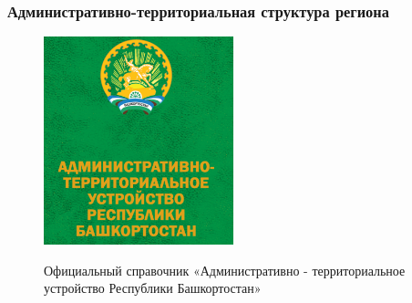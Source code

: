\begin{frame}
\frametitle{Административно-территориальная структура
	региона}

\begin{figure}[h!]
	\begin{center}
		{\includegraphics[width=55mm]{pics/alina/spravka.png}}
		\caption{Официальный справочник «Административно - территориальное устройство Республики Башкортостан»}
	\end{center}
\end{figure}

\end{frame}
